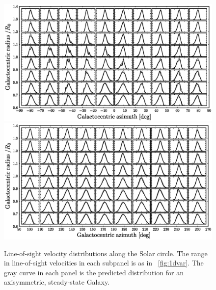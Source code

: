 \clearpage
\begin{figure}
\includegraphics[width=\textwidth]{figs_hercules/rphi1d.ps}\\
\includegraphics[width=\textwidth]{figs_hercules/rphi1d2.ps}
\caption[Line-of-sight velocity distributions along the Solar
  circle]{Line-of-sight velocity distributions along the Solar
  circle. The range in line-of-sight velocities in each subpanel is as
  in \figurename~\ref{fig:1dvar}. The gray curve in each panel is the
  predicted distribution for an axisymmetric, steady-state
  Galaxy.}\label{fig:rphi1d}
\end{figure}

